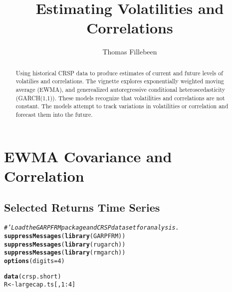 \documentclass[a4paper]{article}\usepackage[]{graphicx}\usepackage[]{color}
\makeatletter
\newcommand{\hlnum}[1]{\textcolor[rgb]{0.686,0.059,0.569}{#1}}%
\newcommand{\hlcom}[1]{\textcolor[rgb]{0.678,0.584,0.686}{\textit{#1}}}%
\newcommand{\hlopt}[1]{\textcolor[rgb]{0,0,0}{#1}}%
\newcommand{\hlstd}[1]{\textcolor[rgb]{0.345,0.345,0.345}{#1}}%
\newcommand{\hlkwb}[1]{\textcolor[rgb]{0.69,0.353,0.396}{#1}}%
\newcommand{\hlkwc}[1]{\textcolor[rgb]{0.333,0.667,0.333}{#1}}%
\newcommand{\hlkwd}[1]{\textcolor[rgb]{0.737,0.353,0.396}{\textbf{#1}}}%
\newenvironment{kframe}{%
 \def\at@end@of@kframe{}%
 \ifinner\ifhmode%
  \def\at@end@of@kframe{\end{minipage}}%
  \begin{minipage}{\columnwidth}%
 \fi\fi%
 \def\FrameCommand##1{\hskip\@totalleftmargin \hskip-\fboxsep
 \colorbox{shadecolor}{##1}\hskip-\fboxsep
     \hskip-\linewidth \hskip-\@totalleftmargin \hskip\columnwidth}%
 \MakeFramed {\advance\hsize-\width
   \@totalleftmargin\z@ \linewidth\hsize
   \@setminipage}}%
 {\par\unskip\endMakeFramed%
 \at@end@of@kframe}
\newenvironment{knitrout}{}{} %
\makeatother
\begin{document}
\title{Estimating Volatilities and Correlations}
\author{Thomas Fillebeen}

\maketitle

\begin{abstract}
Using historical CRSP data to produce estimates of current and future levels of volatilies and correlations. The vignette explores exponentially weighted moving average (EWMA), and generealized autoregressive conditional heteroscedasticity (GARCH(1,1)). These models recognize that volatilities and correlations are not constant. The models attempt to track variations in volatilities or correlation and forecast them into the future.
\end{abstract}

\tableofcontents

\section{EWMA Covariance and Correlation}
\subsection{Selected Returns Time Series}
\begin{knitrout}
\color{fgcolor}\begin{kframe}
\begin{alltt}
\hlcom{# 'Load the GARPFRM package and CRSP dataset for analysis.}
\hlkwd{suppressMessages}\hlstd{(}\hlkwd{library}\hlstd{(GARPFRM))}
\hlkwd{suppressMessages}\hlstd{(}\hlkwd{library}\hlstd{(rugarch))}
\hlkwd{suppressMessages}\hlstd{(}\hlkwd{library}\hlstd{(rmgarch))}
\hlkwd{options}\hlstd{(}\hlkwc{digits} \hlstd{=} \hlnum{4}\hlstd{)}

\hlkwd{data}\hlstd{(crsp.short)}
\hlstd{R} \hlkwb{<-} \hlstd{largecap.ts[,} \hlnum{1}\hlopt{:}\hlnum{4}\hlstd{]}
\end{alltt}
\end{kframe}
\end{knitrout}
\end{document}
